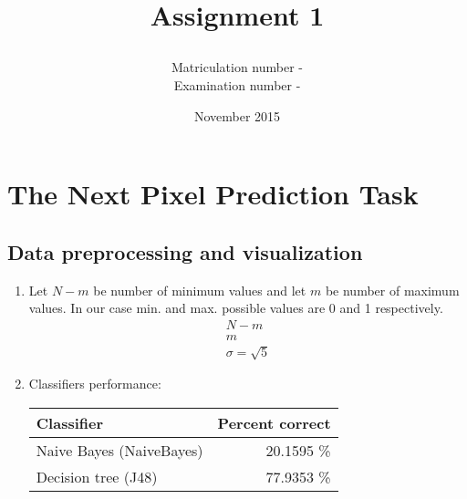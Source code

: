 \documentclass{article}
\title{\subject\\Assignment 1}
\date{November 2015}
\author{Matriculation number - \matricno\\Examination number - \exmno}
\begin{document}
\maketitle
	\section{The Next Pixel Prediction Task}
		\subsection{Data preprocessing and visualization}
			 \begin{enumerate}[label=(\alph*)]
				\item
					Let $N-m$ be number of minimum values and let $m$ be number of maximum values. In our case min. and max. possible values are 0 and 1 respectively.
					\begin{gather*}
						N-m\\
						m\\
						\sigma = \sqrt{5}
					\end{gather*}
				\item 
					Classifiers performance:
					\begin{center}
						\begin{tabular}{| l | r |}
							\hline
							Classifier & Percent correct \\ \hline
							Naive Bayes (NaiveBayes) & 20.1595 \% \\ 
							Decision tree (J48) & 77.9353 \% \\
							\hline
						\end{tabular}
					\end{center}

			\end{enumerate}		
\end{document}
